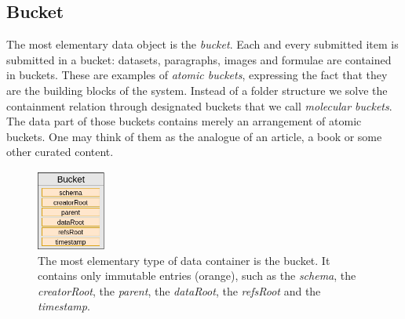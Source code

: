 \documentclass[14pt]{article}
\begin{document}
\subsection{Bucket}
The most elementary data object is the \textit{bucket}. Each and every submitted item is submitted in a bucket: datasets, paragraphs, images and formulae are contained in buckets. These are examples of \textit{atomic buckets}, expressing the fact that they are the building blocks of the system. 
Instead of a folder structure we solve the containment relation through designated buckets that we call \textit{molecular buckets}. The data part of those buckets contains merely an arrangement of atomic buckets. One may think of them as the analogue of an article, a book or some other curated content. 


\begin{figure}[h!]
  \begin{center}
    \includegraphics[width=0.20\textwidth]{img/DataBucketV2.png}
\end{center}
 \caption{The most elementary type of data container is the bucket. It contains only immutable entries (orange), such as the \textit{schema}, the \textit{creatorRoot}, the \textit{parent}, the \textit{dataRoot}, the \textit{refsRoot} and the \textit{timestamp}.}
 \label{fig:bucket}
\end{figure}
\end{document}
